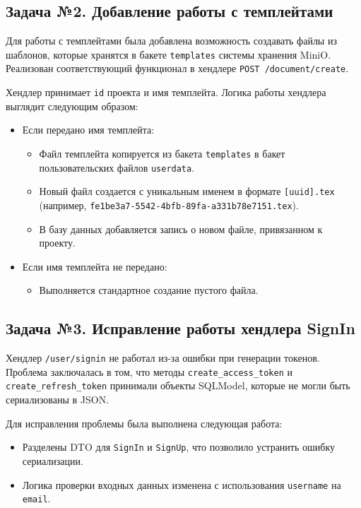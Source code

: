 \documentclass[a4paper,12pt]{article}
\begin{document}
\subsection*{Задача №2. Добавление работы с темплейтами}
Для работы с темплейтами была добавлена возможность создавать файлы из шаблонов, которые хранятся в бакете \texttt{templates} системы хранения MiniO. Реализован соответствующий функционал в хендлере \texttt{POST /document/create}.

Хендлер принимает \texttt{id} проекта и имя темплейта. Логика работы хендлера выглядит следующим образом:
\begin{itemize}
    \item Если передано имя темплейта:
    \begin{itemize}
        \item Файл темплейта копируется из бакета \texttt{templates} в бакет пользовательских файлов \texttt{userdata}.
        \item Новый файл создается с уникальным именем в формате \texttt{[uuid].tex} (например, \texttt{fe1be3a7-5542-4bfb-89fa-a331b78e7151.tex}).
        \item В базу данных добавляется запись о новом файле, привязанном к проекту.
    \end{itemize}
    
    \item Если имя темплейта не передано:
    \begin{itemize}
        \item Выполняется стандартное создание пустого файла.
    \end{itemize}
\end{itemize}

\subsection*{Задача №3. Исправление работы хендлера SignIn}
Хендлер \texttt{/user/signin} не работал из-за ошибки при генерации токенов. Проблема заключалась в том, что методы \texttt{create\_access\_token} и \texttt{create\_refresh\_token} принимали объекты SQLModel, которые не могли быть сериализованы в JSON.

Для исправления проблемы была выполнена следующая работа:
\begin{itemize}
    \item Разделены DTO для \texttt{SignIn} и \texttt{SignUp}, что позволило устранить ошибку сериализации.
    \item Логика проверки входных данных изменена с использования \texttt{username} на \texttt{email}.
\end{itemize}
\end{document}
